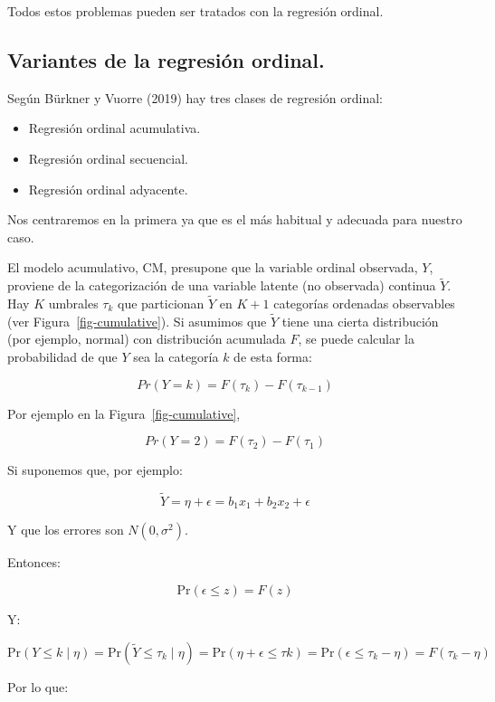 \documentclass[
  letterpaper,
  DIV=11,
  numbers=noendperiod]{scrartcl}
\providecommand{\tightlist}{%
  \setlength{\itemsep}{0pt}\setlength{\parskip}{0pt}}\usepackage{longtable,booktabs,array}
\begin{document}
Todos estos problemas pueden ser tratados con la regresión ordinal.

\hypertarget{variantes-de-la-regresiuxf3n-ordinal.}{%
\subsection{Variantes de la regresión
ordinal.}\label{variantes-de-la-regresiuxf3n-ordinal.}}

Según Bürkner y Vuorre (2019) hay tres clases de regresión ordinal:

\begin{itemize}
\tightlist
\item
  Regresión ordinal acumulativa.
\item
  Regresión ordinal secuencial.
\item
  Regresión ordinal adyacente.
\end{itemize}

Nos centraremos en la primera ya que es el más habitual y adecuada para
nuestro caso.

El modelo acumulativo, CM, presupone que la variable ordinal observada,
\(Y\), proviene de la categorización de una variable latente (no
observada) continua \(\tilde{Y}\). Hay \(K\) umbrales \(\tau_k\) que
particionan \(\tilde{Y}\) en \(K + 1\) categorías ordenadas observables
(ver Figura~\ref{fig-cumulative}). Si asumimos que \(\tilde{Y}\) tiene
una cierta distribución (por ejemplo, normal) con distribución acumulada
\(F\), se puede calcular la probabilidad de que \(Y\) sea la categoría
\(k\) de esta forma:

\[Pr(Y = k) = F(\tau_k) - F(\tau_{k-1})\]

Por ejemplo en la Figura~\ref{fig-cumulative},

\[Pr(Y = 2) = F(\tau_2) - F(\tau_{1})\]

Si suponemos que, por ejemplo:

\[\tilde{Y} = \eta + \epsilon = b_1 x_1 + b_2 x_2 + \epsilon\]

Y que los errores son \(N(0,\sigma^2)\).

Entonces:

\[\mathrm{Pr}(\epsilon \leq z) = F(z)\]

Y:

\[\mathrm{Pr}(Y \leq k \mid \eta) = \mathrm{Pr}(\tilde{Y} \leq \tau_k \mid \eta) = \mathrm{Pr}(\eta + \epsilon \leq \tau k) = \mathrm{Pr}(\epsilon \leq \tau_k - \eta) = F(\tau_k - \eta)\]

Por lo que:
\end{document}
